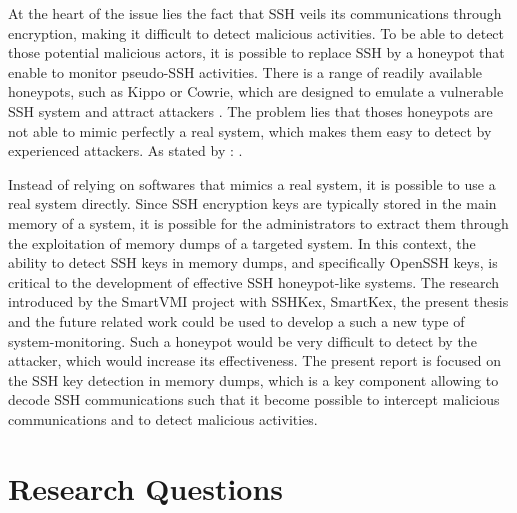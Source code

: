 At the heart of the issue lies the fact that SSH veils its communications through encryption, making it difficult to detect malicious activities. To be able to detect those potential malicious actors, it is possible to replace SSH by a honeypot that enable to monitor pseudo-SSH activities. There is a range of readily available honeypots, such as Kippo or Cowrie, which are designed to emulate a vulnerable SSH system and attract attackers \cite{ClassificationMalware21}. The problem lies that thoses honeypots are not able to mimic perfectly a real system, which makes them easy to detect by experienced attackers. As stated by :  \cite{SSHHoneypotEffectiveness23}. 

Instead of relying on softwares that mimics a real system, it is possible to use a real system directly. Since SSH encryption keys are typically stored in the main memory of a system, it is possible for the administrators to extract them through the exploitation of memory dumps of a targeted system. In this context, the ability to detect SSH keys in memory dumps, and specifically OpenSSH keys, is critical to the development of effective SSH honeypot-like systems. The research introduced by the SmartVMI project with SSHKex, SmartKex, the present thesis and the future related work could be used to develop a such a new type of system-monitoring. Such a honeypot would be very difficult to detect by the attacker, which would increase its effectiveness. The present report is focused on the SSH key detection in memory dumps, which is a key component allowing to decode SSH communications such that it become possible to intercept malicious communications and to detect malicious activities.

\section{Research Questions}


